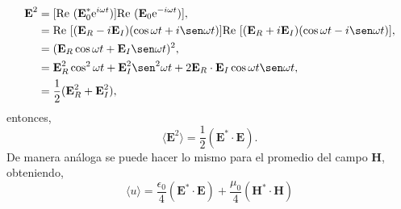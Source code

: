 \documentclass[11pt,fleqn]{book} %
\begin{document}
\begin{equation*}
\begin{split}
\textbf{E}^2&=[\text{Re }(\textbf{E}_0^{\ast}\text{e}^{i\omega t})]\text{Re }(\textbf{E}_0 \text{e}^{-i\omega t})],\\
&=\text{Re }[(\textbf{E}_R-i\textbf{E}_I)(\cos\omega t+i\sen\omega t)]\text{Re }[(\textbf{E}_R+i\textbf{E}_I)(\cos\omega t-i\sen\omega t)],\\
&=(\textbf{E}_R\cos\omega t+\textbf{E}_I\sen\omega t)^2,\\
&=\textbf{E}_R^2\cos^2\omega t+\textbf{E}_I^2\sen^2\omega t+2\textbf{E}_R\cdot\textbf{E}_I\cos\omega t\sen\omega t,\\
&=\frac{1}{2}(\textbf{E}_R^2+\textbf{E}_I^2),
\end{split}
\end{equation*}
entonces,
\begin{equation*}
 \langle \textbf{E}^2 \rangle=\frac{1}{2}(\textbf{E}^\ast\cdot\textbf{E}).
\end{equation*}
De manera an\'aloga se puede hacer lo mismo para el promedio del campo $\textbf{H}$, obteniendo,
\begin{equation}
 \langle u \rangle=\frac{\epsilon_0}{4}(\textbf{E}^\ast\cdot\textbf{E})+\frac{\mu_0}{4}(\textbf{H}^\ast\cdot\textbf{H})
\end{equation}
\end{document}
